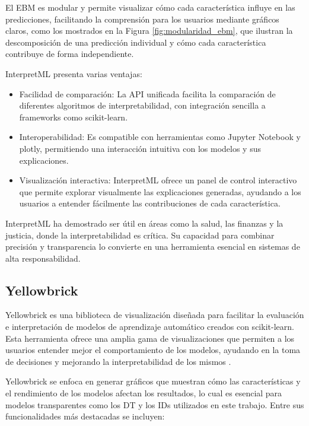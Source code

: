 El EBM es modular y permite visualizar cómo cada característica influye en las predicciones, facilitando la comprensión para los usuarios mediante gráficos claros, como los mostrados en la Figura \ref{fig:modularidad_ebm}, que ilustran la descomposición de una predicción individual y cómo cada característica contribuye de forma independiente.

InterpretML presenta varias ventajas:
\begin{itemize}
    \item Facilidad de comparación: La API unificada facilita la comparación de diferentes algoritmos de interpretabilidad, con integración sencilla a frameworks como scikit-learn.
    \item Interoperabilidad: Es compatible con herramientas como Jupyter Notebook y plotly, permitiendo una interacción intuitiva con los modelos y sus explicaciones.
    \item Visualización interactiva: InterpretML ofrece un panel de control interactivo que permite explorar visualmente las explicaciones generadas, ayudando a los usuarios a entender fácilmente las contribuciones de cada característica.
\end{itemize}

InterpretML ha demostrado ser útil en áreas como la salud, las finanzas y la justicia, donde la interpretabilidad es crítica. Su capacidad para combinar precisión y transparencia lo convierte en una herramienta esencial en sistemas de alta responsabilidad.

\subsection{Yellowbrick}

Yellowbrick es una biblioteca de visualización diseñada para facilitar la evaluación e interpretación de modelos de aprendizaje automático creados con scikit-learn. Esta herramienta ofrece una amplia gama de visualizaciones que permiten a los usuarios entender mejor el comportamiento de los modelos, ayudando en la toma de decisiones y mejorando la interpretabilidad de los mismos \cite{bengfort_yellowbrick_2018}.

Yellowbrick se enfoca en generar gráficos que muestran cómo las características y el rendimiento de los modelos afectan los resultados, lo cual es esencial para modelos transparentes como los DT y los IDs utilizados en este trabajo. Entre sus funcionalidades más destacadas se incluyen:

